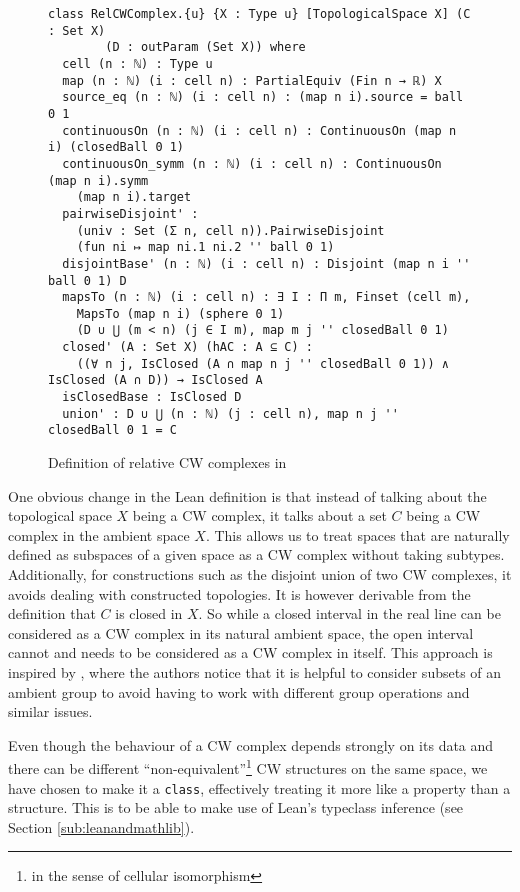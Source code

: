 \begin{figure}
\caption{Definition of relative CW complexes in \mathlib}
\label{fig:def}
\begin{lstlisting}[frame=single]
class RelCWComplex.{u} {X : Type u} [TopologicalSpace X] (C : Set X) 
        (D : outParam (Set X)) where
  cell (n : ℕ) : Type u
  map (n : ℕ) (i : cell n) : PartialEquiv (Fin n → ℝ) X
  source_eq (n : ℕ) (i : cell n) : (map n i).source = ball 0 1
  continuousOn (n : ℕ) (i : cell n) : ContinuousOn (map n i) (closedBall 0 1)
  continuousOn_symm (n : ℕ) (i : cell n) : ContinuousOn (map n i).symm 
    (map n i).target
  pairwiseDisjoint' :
    (univ : Set (Σ n, cell n)).PairwiseDisjoint 
    (fun ni ↦ map ni.1 ni.2 '' ball 0 1)
  disjointBase' (n : ℕ) (i : cell n) : Disjoint (map n i '' ball 0 1) D
  mapsTo (n : ℕ) (i : cell n) : ∃ I : Π m, Finset (cell m),
    MapsTo (map n i) (sphere 0 1) 
    (D ∪ ⋃ (m < n) (j ∈ I m), map m j '' closedBall 0 1)
  closed' (A : Set X) (hAC : A ⊆ C) :
    ((∀ n j, IsClosed (A ∩ map n j '' closedBall 0 1)) ∧ IsClosed (A ∩ D)) → IsClosed A
  isClosedBase : IsClosed D
  union' : D ∪ ⋃ (n : ℕ) (j : cell n), map n j '' closedBall 0 1 = C
\end{lstlisting}
\end{figure}

One obvious change in the Lean definition is that instead of talking about the topological space $X$ being a CW complex, it talks about a set $C$ being a CW complex in the ambient space $X$.
This allows us to treat spaces that are naturally defined as subspaces of a given space as a CW complex without taking subtypes. 
Additionally, for constructions such as the disjoint union of two CW complexes, it avoids dealing with constructed topologies.
It is however derivable from the definition that $C$ is closed in $X$. 
So while a closed interval in the real line can be considered as a CW complex in its natural ambient space, the open interval cannot and needs to be considered as a CW complex in itself. 
This approach is inspired by \cite{Gonthier2013}, where the authors notice that it is helpful to consider subsets of an ambient group to avoid having to work with different group operations and similar issues.

Even though the behaviour of a CW complex depends strongly on its data and there can be different ``non-equivalent''\footnote{in the sense of cellular isomorphism} CW structures on the same space, we have chosen to make it a \lstinline|class|, effectively treating it more like a property than a structure. 
This is to be able to make use of Lean's typeclass inference (see Section \ref{sub:leanandmathlib}).

